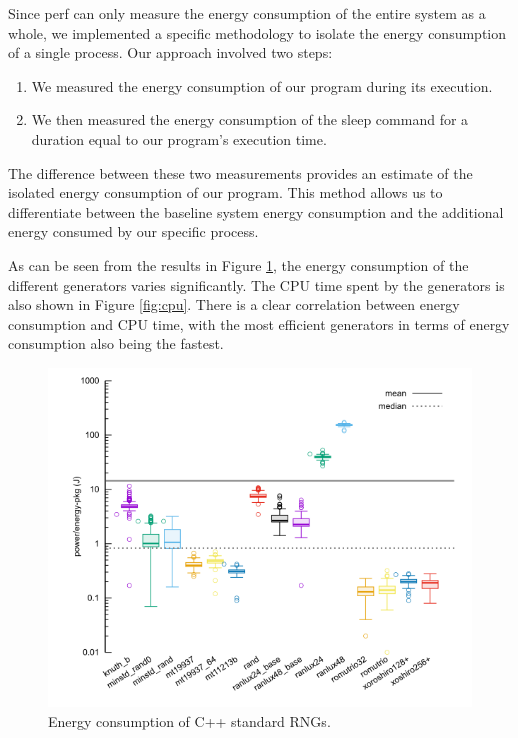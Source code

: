 \documentclass[dvipsnames,format=sigconf,anonymous=true,review=true]{acmart}
\begin{document}
Since perf can only measure the energy consumption of the entire system as a whole, we implemented a specific methodology to isolate the energy consumption of a single process. Our approach involved two steps:

\begin{enumerate}
\item We measured the energy consumption of our program during its execution.
\item We then measured the energy consumption of the sleep command for a duration equal to our program's execution time.
\end{enumerate}

The difference between these two measurements provides an estimate of the isolated energy consumption of our program. This method allows us to differentiate between the baseline system energy consumption and the additional energy consumed by our specific process.

As can be seen from the results in Figure \ref{fig:pkg}, the energy consumption of the different generators varies significantly. The CPU time spent by the generators is also shown in Figure \ref{fig:cpu}. There is a clear correlation between energy consumption and CPU time, with the most efficient generators in terms of energy consumption also being the fastest.

\begin{figure}
\centering
\includegraphics[width=\columnwidth]{pkg.png}
\caption{Energy consumption of C++ standard RNGs.}
\label{fig:pkg}
\end{figure}
\end{document}
